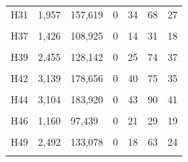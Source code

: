 \documentclass[
  a4paper,
  titlepage]{article}
\begin{document}
\begin{longtable}[t]{lllllll}
H31 & 1,957 & 157,619 & 0 & 34 & 68 & 27\\
 
\cellcolor{gray!6}{H36} & \cellcolor{gray!6}{2,841} & \cellcolor{gray!6}{170,386} & \cellcolor{gray!6}{0} & \cellcolor{gray!6}{35} & \cellcolor{gray!6}{82} & \cellcolor{gray!6}{38}\\
 
H37 & 1,426 & 108,925 & 0 & 14 & 31 & 18\\
 
\cellcolor{gray!6}{H38} & \cellcolor{gray!6}{2,056} & \cellcolor{gray!6}{171,420} & \cellcolor{gray!6}{0} & \cellcolor{gray!6}{29} & \cellcolor{gray!6}{56} & \cellcolor{gray!6}{26}\\
 
H39 & 2,455 & 128,142 & 0 & 25 & 74 & 37\\
 
\cellcolor{gray!6}{H41} & \cellcolor{gray!6}{2,730} & \cellcolor{gray!6}{186,208} & \cellcolor{gray!6}{0} & \cellcolor{gray!6}{31} & \cellcolor{gray!6}{77} & \cellcolor{gray!6}{37}\\
 
H42 & 3,139 & 178,656 & 0 & 40 & 75 & 35\\
 
\cellcolor{gray!6}{H43} & \cellcolor{gray!6}{2,630} & \cellcolor{gray!6}{128,936} & \cellcolor{gray!6}{0} & \cellcolor{gray!6}{31} & \cellcolor{gray!6}{70} & \cellcolor{gray!6}{28}\\
 
H44 & 3,104 & 183,920 & 0 & 43 & 90 & 41\\
 
\cellcolor{gray!6}{H45} & \cellcolor{gray!6}{2,808} & \cellcolor{gray!6}{157,510} & \cellcolor{gray!6}{0} & \cellcolor{gray!6}{33} & \cellcolor{gray!6}{69} & \cellcolor{gray!6}{32}\\
 
H46 & 1,160 & 97,439 & 0 & 21 & 29 & 19\\
 
\cellcolor{gray!6}{H47} & \cellcolor{gray!6}{2,271} & \cellcolor{gray!6}{128,342} & \cellcolor{gray!6}{0} & \cellcolor{gray!6}{23} & \cellcolor{gray!6}{68} & \cellcolor{gray!6}{21}\\
 
H49 & 2,492 & 133,078 & 0 & 18 & 63 & 24\\
 
\cellcolor{gray!6}{H50} & \cellcolor{gray!6}{2,640} & \cellcolor{gray!6}{157,996} & \cellcolor{gray!6}{0} & \cellcolor{gray!6}{29} & \cellcolor{gray!6}{74} & \cellcolor{gray!6}{27}\\
 

\end{longtable}
\end{document}
